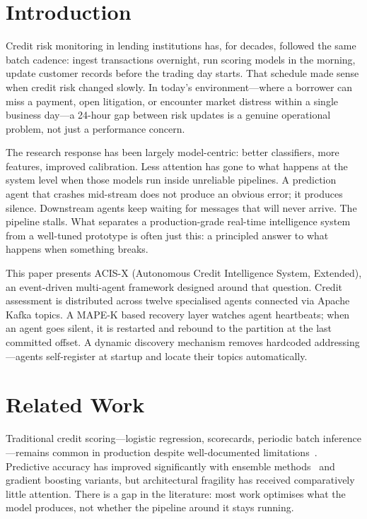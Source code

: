 \documentclass[runningheads]{llncs}
\begin{document}
\section{Introduction}

Credit risk monitoring in lending institutions has, for decades, followed the same batch cadence: ingest transactions overnight, run scoring models in the morning, update customer records before the trading day starts. That schedule made sense when credit risk changed slowly. In today's environment---where a borrower can miss a payment, open litigation, or encounter market distress within a single business day---a 24-hour gap between risk updates is a genuine operational problem, not just a performance concern.

The research response has been largely model-centric: better classifiers, more features, improved calibration. Less attention has gone to what happens at the system level when those models run inside unreliable pipelines. A prediction agent that crashes mid-stream does not produce an obvious error; it produces silence. Downstream agents keep waiting for messages that will never arrive. The pipeline stalls. What separates a production-grade real-time intelligence system from a well-tuned prototype is often just this: a principled answer to what happens when something breaks.

This paper presents ACIS-X (Autonomous Credit Intelligence System, Extended), an event-driven multi-agent framework designed around that question. Credit assessment is distributed across twelve specialised agents connected via Apache Kafka topics. A MAPE-K based recovery layer watches agent heartbeats; when an agent goes silent, it is restarted and rebound to the partition at the last committed offset. A dynamic discovery mechanism removes hardcoded addressing---agents self-register at startup and locate their topics automatically.

\section{Related Work}

Traditional credit scoring---logistic regression, scorecards, periodic batch inference---remains common in production despite well-documented limitations~\cite{altman1968financial}. Predictive accuracy has improved significantly with ensemble methods~\cite{breiman2001random} and gradient boosting variants, but architectural fragility has received comparatively little attention. There is a gap in the literature: most work optimises what the model produces, not whether the pipeline around it stays running.
\end{document}
